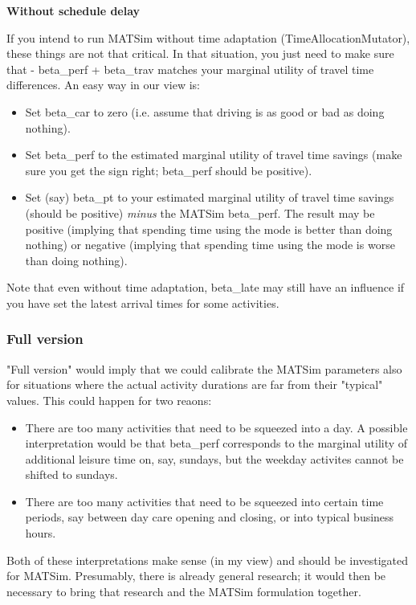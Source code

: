 \documentclass[a4paper,11pt]{report}
\begin{document}
\textbf{Without schedule delay}

If you intend to run MATSim without time adaptation  (TimeAllocationMutator), these things are not that critical. In  that situation, you just need to make sure that - beta\_perf + beta\_trav  matches your marginal utility of travel time differences. An easy  way in our view is:
\begin{itemize}
	\item Set beta\_car to zero (i.e. assume that driving is as good or bad as doing nothing).
	\item Set beta\_perf to the estimated marginal utility of travel time  savings (make sure you get the sign right; beta\_perf should be  positive).
	\item Set (say) beta\_pt to your estimated marginal utility of travel time savings (should be positive) \emph{minus}  the MATSim beta\_perf. The result may be positive (implying that  spending time using the mode is better than doing nothing) or negative  (implying that spending time using the mode is worse than doing  nothing).
\end{itemize}

Note that even without time adaptation, beta\_late may still have  an influence if you have set the latest arrival times for some  activities.

\subsubsection{Full version}

"Full version" would imply that we could calibrate the MATSim  parameters also for situations where the actual activity durations are  far from their "typical" values. This could happen for two reaons:
\begin{itemize}
	\item There are too many activities that need to be squeezed into a  day. A possible interpretation would be that beta\_perf corresponds  to the marginal utility of additional leisure time on, say, sundays,  but the weekday activites cannot be shifted to sundays.
	\item There are too many activities that need to be squeezed into certain  time periods, say between day care opening and closing, or into typical  business hours.
\end{itemize}

Both of these interpretations make sense (in my view) and should  be investigated for MATSim. Presumably, there is already general  research; it would then be necessary to bring that research and the  MATSim formulation together.
\end{document}
